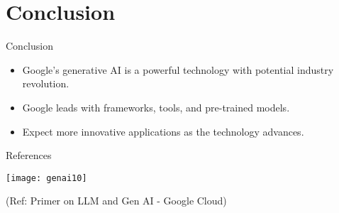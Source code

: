 \section{Conclusion}

\begin{frame}[fragile]{Conclusion}
\begin{itemize}
\item Google's generative AI is a powerful technology with potential industry revolution.
\item Google leads with frameworks, tools, and pre-trained models.
\item Expect more innovative applications as the technology advances.
\end{itemize}
\end{frame}

\begin{frame}[fragile]{References}

\begin{center}
\texttt{[image: genai10]}
\end{center}

{\tiny (Ref: Primer on LLM and Gen AI - Google Cloud)}
  
\end{frame}